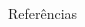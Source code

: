 \documentclass[final]{beamer}
\begin{document}
\begin{frame}[t,fragile]
\begin{columns}[t]
\begin{column}{0.9328981723\paperwidth}
\begin{block}{Referências}
\begin{multicols}{2}
\end{multicols}

\end{block}

\end{column}
\end{columns}
\end{frame}
\end{document}
